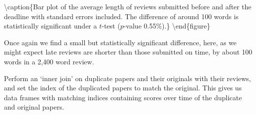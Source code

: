 \textbackslash caption\{Bar plot of the average length of reviews
submitted before and after the deadline with standard errors included.
The difference of around 100 words is statistically significant under a
\(t\)-test (\(p\)-value 0.55\%).\} \label{review-length-early-late}
\textbackslash end\{figure\}

Once again we find a small but statistically significant difference,
here, as we might expect late reviews are shorter than those submitted
on time, by about 100 words in a 2,400 word review.

\begin{Shaded}
\begin{Highlighting}[]
\OperatorTok{=}\OperatorTok{=}\OperatorTok{=}
\OperatorTok{=}\OperatorTok{=}\NormalTok{)}
\OperatorTok{=}\OperatorTok{=}\NormalTok{)}\OperatorTok{/}\OperatorTok{=}\NormalTok{) }
\end{Highlighting}
\end{Shaded}

\begin{Shaded}
\begin{Highlighting}[]
\OperatorTok{=}\OperatorTok{=}\NormalTok{)}
\OperatorTok{=}\OperatorTok{=}\NormalTok{)}
\end{Highlighting}
\end{Shaded}

Perform an `inner join' on duplicate papers and their originals with
their reviews, and set the index of the duplicated papers to match the
original. This gives us data frames with matching indices containing
scores over time of the duplicate and original papers.

